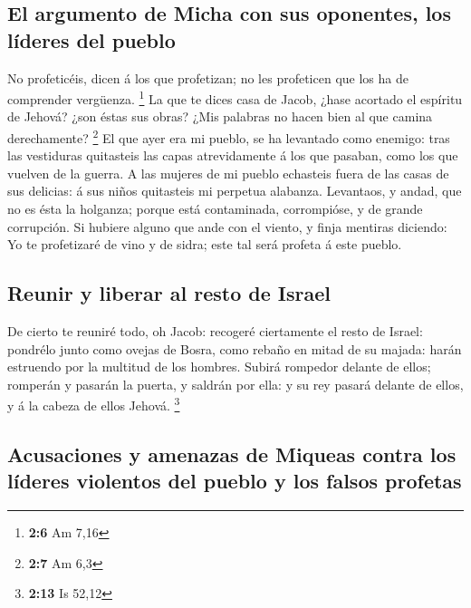 \hypertarget{el-argumento-de-micha-con-sus-oponentes-los-luxedderes-del-pueblo}{%
\subsection{El argumento de Micha con sus oponentes, los líderes del
pueblo}\label{el-argumento-de-micha-con-sus-oponentes-los-luxedderes-del-pueblo}}

 No profeticéis, dicen á los que profetizan; no les
profeticen que los ha de comprender vergüenza. \footnote{\textbf{2:6} Am
  7,16}  La que te dices casa de Jacob, ¿hase acortado el
espíritu de Jehová? ¿son éstas sus obras? ¿Mis palabras no hacen bien al
que camina derechamente? \footnote{\textbf{2:7} Am 6,3}  El
que ayer era mi pueblo, se ha levantado como enemigo: tras las
vestiduras quitasteis las capas atrevidamente á los que pasaban, como
los que vuelven de la guerra.  A las mujeres de mi pueblo
echasteis fuera de las casas de sus delicias: á sus niños quitasteis mi
perpetua alabanza.  Levantaos, y andad, que no es ésta la
holganza; porque está contaminada, corrompióse, y de grande corrupción.
 Si hubiere alguno que ande con el viento, y finja mentiras
diciendo: Yo te profetizaré de vino y de sidra; este tal será profeta á
este pueblo.

\hypertarget{reunir-y-liberar-al-resto-de-israel}{%
\subsection{Reunir y liberar al resto de
Israel}\label{reunir-y-liberar-al-resto-de-israel}}

 De cierto te reuniré todo, oh Jacob: recogeré ciertamente
el resto de Israel: pondrélo junto como ovejas de Bosra, como rebaño en
mitad de su majada: harán estruendo por la multitud de los hombres.
 Subirá rompedor delante de ellos; romperán y pasarán la
puerta, y saldrán por ella: y su rey pasará delante de ellos, y á la
cabeza de ellos Jehová. \footnote{\textbf{2:13} Is 52,12}

\hypertarget{acusaciones-y-amenazas-de-miqueas-contra-los-luxedderes-violentos-del-pueblo-y-los-falsos-profetas}{%
\subsection{Acusaciones y amenazas de Miqueas contra los líderes
violentos del pueblo y los falsos
profetas}\label{acusaciones-y-amenazas-de-miqueas-contra-los-luxedderes-violentos-del-pueblo-y-los-falsos-profetas}}

